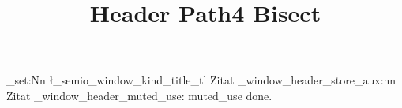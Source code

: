 \documentclass[type=zwischenbericht]{zukunftbau}
\title{Header Path4 Bisect}
\begin{document}
\ExplSyntaxOn
\tl_set:Nn \l_semio_window_kind_title_tl { Zitat }
\semio_window_header_store_aux:nn { } { Zitat }
\semio_window_header_muted_use:
\ExplSyntaxOff
muted_use done.
\end{document}
